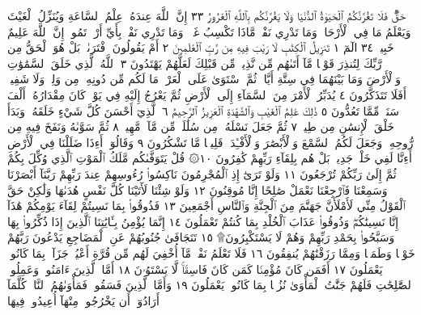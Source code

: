 حَقࣱّۖ فَلَا تَغُرَّنَّكُمُ ٱلْحَيَوٰةُ ٱلدُّنْيَا وَلَا يَغُرَّنَّكُم بِٱللَّهِ
ٱلْغَرُورُ ٣٣ إِنَّ ٱللَّهَ عِندَهُۥ عِلْمُ ٱلسَّاعَةِ وَيُنَزِّلُ ٱلْغَيْثَ
وَيَعْلَمُ مَا فِي ٱلْأَرْحَامِۖ وَمَا تَدْرِي نَفْسࣱ مَّاذَا تَكْسِبُ غَدࣰاۖ
وَمَا تَدْرِي نَفْسُۢ بِأَيِّ أَرْضࣲ تَمُوتُۚ إِنَّ ٱللَّهَ عَلِيمٌ خَبِيرُۢ ٣٤
الٓمٓ ١ تَنزِيلُ ٱلْكِتَٰبِ لَا رَيْبَ فِيهِ مِن رَّبِّ ٱلْعَٰلَمِينَ ٢
أَمْ يَقُولُونَ ٱفْتَرَىٰهُۚ بَلْ هُوَ ٱلْحَقُّ مِن رَّبِّكَ لِتُنذِرَ قَوْمࣰا مَّآ أَتَىٰهُم
مِّن نَّذِيرࣲ مِّن قَبْلِكَ لَعَلَّهُمْ يَهْتَدُونَ ٣ ٱللَّهُ ٱلَّذِي خَلَقَ
ٱلسَّمَٰوَٰتِ وَٱلْأَرْضَ وَمَا بَيْنَهُمَا فِي سِتَّةِ أَيَّامࣲ ثُمَّ ٱسْتَوَىٰ عَلَى
ٱلْعَرْشِۖ مَا لَكُم مِّن دُونِهِۦ مِن وَلِيࣲّ وَلَا شَفِيعٍۚ أَفَلَا تَتَذَكَّرُونَ ٤
يُدَبِّرُ ٱلْأَمْرَ مِنَ ٱلسَّمَآءِ إِلَى ٱلْأَرْضِ ثُمَّ يَعْرُجُ إِلَيْهِ فِي يَوْمࣲ كَانَ
مِقْدَارُهُۥٓ أَلْفَ سَنَةࣲ مِّمَّا تَعُدُّونَ ٥ ذَٰلِكَ عَٰلِمُ ٱلْغَيْبِ وَٱلشَّهَٰدَةِ
ٱلْعَزِيزُ ٱلرَّحِيمُ ٦ ٱلَّذِيٓ أَحْسَنَ كُلَّ شَيْءٍ خَلَقَهُۥۖ وَبَدَأَ خَلْقَ ٱلْإِنسَٰنِ
مِن طِينࣲ ٧ ثُمَّ جَعَلَ نَسْلَهُۥ مِن سُلَٰلَةࣲ مِّن مَّآءࣲ مَّهِينࣲ ٨
ثُمَّ سَوَّىٰهُ وَنَفَخَ فِيهِ مِن رُّوحِهِۦۖ وَجَعَلَ لَكُمُ ٱلسَّمْعَ وَٱلْأَبْصَٰرَ
وَٱلْأَفْـِٔدَةَۚ قَلِيلࣰا مَّا تَشْكُرُونَ ٩ وَقَالُوٓا۟ أَءِذَا ضَلَلْنَا فِي ٱلْأَرْضِ
أَءِنَّا لَفِي خَلْقࣲ جَدِيدِۭۚ بَلْ هُم بِلِقَآءِ رَبِّهِمْ كَٰفِرُونَ ١٠۞ قُلْ يَتَوَفَّىٰكُم
مَّلَكُ ٱلْمَوْتِ ٱلَّذِي وُكِّلَ بِكُمْ ثُمَّ إِلَىٰ رَبِّكُمْ تُرْجَعُونَ ١١
وَلَوْ تَرَىٰٓ إِذِ ٱلْمُجْرِمُونَ نَاكِسُوا۟ رُءُوسِهِمْ عِندَ رَبِّهِمْ
رَبَّنَآ أَبْصَرْنَا وَسَمِعْنَا فَٱرْجِعْنَا نَعْمَلْ صَٰلِحًا إِنَّا مُوقِنُونَ ١٢
وَلَوْ شِئْنَا لَأٓتَيْنَا كُلَّ نَفْسٍ هُدَىٰهَا وَلَٰكِنْ حَقَّ
ٱلْقَوْلُ مِنِّي لَأَمْلَأَنَّ جَهَنَّمَ مِنَ ٱلْجِنَّةِ وَٱلنَّاسِ أَجْمَعِينَ ١٣
فَذُوقُوا۟ بِمَا نَسِيتُمْ لِقَآءَ يَوْمِكُمْ هَٰذَآ إِنَّا نَسِينَٰكُمْۖ
وَذُوقُوا۟ عَذَابَ ٱلْخُلْدِ بِمَا كُنتُمْ تَعْمَلُونَ ١٤ إِنَّمَا يُؤْمِنُ
بِـَٔايَٰتِنَا ٱلَّذِينَ إِذَا ذُكِّرُوا۟ بِهَا  وَسَبَّحُوا۟ بِحَمْدِ
رَبِّهِمْ وَهُمْ لَا يَسْتَكْبِرُونَ۩ ١٥ تَتَجَافَىٰ جُنُوبُهُمْ
عَنِ ٱلْمَضَاجِعِ يَدْعُونَ رَبَّهُمْ خَوْفࣰا وَطَمَعࣰا وَمِمَّا رَزَقْنَٰهُمْ
يُنفِقُونَ ١٦ فَلَا تَعْلَمُ نَفْسࣱ مَّآ أُخْفِيَ لَهُم مِّن قُرَّةِ أَعْيُنࣲ
جَزَآءَۢ بِمَا كَانُوا۟ يَعْمَلُونَ ١٧ أَفَمَن كَانَ مُؤْمِنࣰا كَمَن كَانَ فَاسِقࣰاۚ
لَّا يَسْتَوُۥنَ ١٨ أَمَّا ٱلَّذِينَ ءَامَنُوا۟ وَعَمِلُوا۟ ٱلصَّٰلِحَٰتِ فَلَهُمْ
جَنَّٰتُ ٱلْمَأْوَىٰ نُزُلَۢا بِمَا كَانُوا۟ يَعْمَلُونَ ١٩ وَأَمَّا ٱلَّذِينَ فَسَقُوا۟
فَمَأْوَىٰهُمُ ٱلنَّارُۖ كُلَّمَآ أَرَادُوٓا۟ أَن يَخْرُجُوا۟ مِنْهَآ أُعِيدُوا۟ فِيهَا
